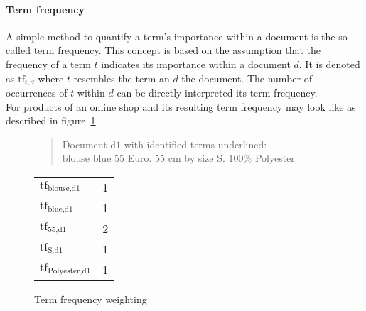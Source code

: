 \paragraph{Term frequency}
\label{sec:tf}
A simple method to quantify a term's importance within a document is the so called term frequency.
This concept is based on the assumption that the frequency of a term $t$ indicates its importance within a document $d$.
It is denoted as $\text{tf}_{t,d}$ where $t$ resembles the term an $d$ the document.
The number of occurrences of $t$ within $d$ can be directly interpreted its term frequency.\citep[p.~117]{manning:2009}\\
For products of an online shop and its resulting term frequency may look like as described in figure~\ref{fig:tfweighting}.\\
\begin{figure}[h]

    \begin{quote}
        Document $\text{d}1$ with identified terms underlined:\\
        \underline{blouse} \underline{blue} \underline{55} Euro. \underline{55} cm by size \underline{S}. 100\% \underline{Polyester}
    \end{quote}

    \center
    \vspace{5mm}
    \begin{tabular}{ l l }
        \rowcolor{\dustRowHead}
        \multicolumn{2}{c}{Term frequency}\\\hline
        $\text{tf}_{\text{blouse},\text{d1}}$       & 1\\
        $\text{tf}_{\text{blue},\text{d1}}$         & 1\\
        $\text{tf}_{\text{55},\text{d1}}$           & 2\\
        $\text{tf}_{\text{S},\text{d1}}$            & 1\\
        $\text{tf}_{\text{Polyester},\text{d1}}$    & 1\\
    \end{tabular}

    \caption{Term frequency weighting}
    \label{fig:tfweighting}
\end{figure}

